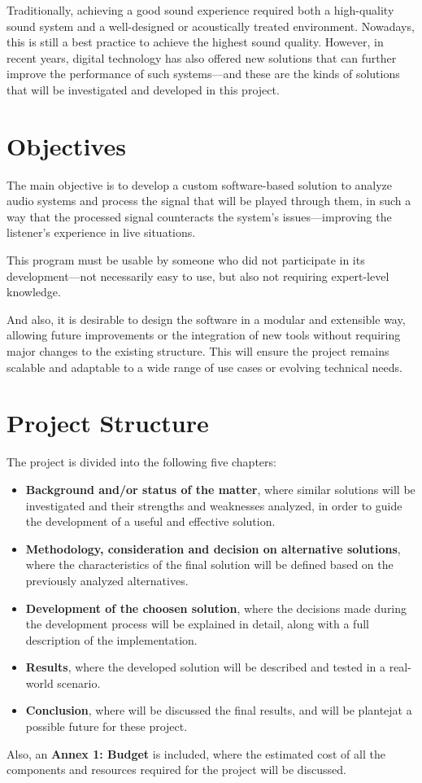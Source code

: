 Traditionally, achieving a good sound experience required both a high-quality sound system and a well-designed or acoustically treated environment. Nowadays, this is still a best practice to achieve the highest sound quality. However, in recent years, digital technology has also offered new solutions that can further improve the performance of such systems—and these are the kinds of solutions that will be investigated and developed in this project.


\section{Objectives}

The main objective is to develop a custom software-based solution to analyze audio systems and process the signal that will be played through them, in such a way that the processed signal counteracts the system’s issues—improving the listener’s experience in live situations.

This program must be usable by someone who did not participate in its development—not necessarily easy to use, but also not requiring expert-level knowledge.

And also, it is desirable to design the software in a modular and extensible way, allowing future improvements or the integration of new tools without requiring major changes to the existing structure. This will ensure the project remains scalable and adaptable to a wide range of use cases or evolving technical needs.

\section{Project Structure}

The project is divided into the following five chapters:

\begin{itemize}
	\item \textbf{Background and/or status of the matter}, where similar solutions will be investigated and their strengths and weaknesses analyzed, in order to guide the development of a useful and effective solution.
	
	\item \textbf{Methodology, consideration and decision on alternative solutions}, where the characteristics of the final solution will be defined based on the previously analyzed alternatives.
	
	\item \textbf{Development of the choosen solution}, where the decisions made during the development process will be explained in detail, along with a full description of the implementation.
	
	\item \textbf{Results}, where the developed solution will be described and tested in a real-world scenario.
	
	\item \textbf{Conclusion}, where will be discussed the final results, and will be plantejat a possible future for these project.
\end{itemize}

Also, an \textbf{Annex 1: Budget} is included, where the estimated cost of all the components and resources required for the project will be discussed.

